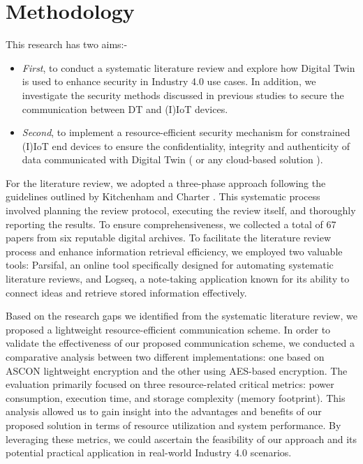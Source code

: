 \section{Methodology}
This research has two aims:-
\begin{itemize}
    \item \textit{First}, to conduct a systematic literature review and explore how Digital Twin is used to enhance security in Industry 4.0 use cases. In addition, we investigate the security methods discussed in previous studies to secure the communication between DT and (I)IoT devices.

    \item \textit{Second}, to implement a resource-efficient security mechanism for constrained (I)IoT end devices to ensure the confidentiality, integrity and authenticity of data communicated with Digital Twin ( or any cloud-based solution ). 
\end{itemize}

For the literature review, we adopted a three-phase approach following the guidelines outlined by Kitchenham and Charter \cite{kitchenham_guidelines_2007}. This systematic process involved planning the review protocol, executing the review itself, and thoroughly reporting the results. To ensure comprehensiveness, we collected a total of 67 papers from six reputable digital archives. To facilitate the literature review process and enhance information retrieval efficiency, we employed two valuable tools: Parsifal, an online tool specifically designed for automating systematic literature reviews, and Logseq, a note-taking application known for its ability to connect ideas and retrieve stored information effectively.

Based on the research gaps we identified from the systematic literature review, we proposed a lightweight resource-efficient communication scheme. In order to validate the effectiveness of our proposed communication scheme, we conducted a comparative analysis between two different implementations: one based on ASCON lightweight encryption and the other using AES-based encryption. The evaluation primarily focused on three resource-related critical metrics: power consumption, execution time, and storage complexity (memory footprint). This analysis allowed us to gain insight into the advantages and benefits of our proposed solution in terms of resource utilization and system performance. By leveraging these metrics, we could ascertain the feasibility of our approach and its potential practical application in real-world Industry 4.0 scenarios.



